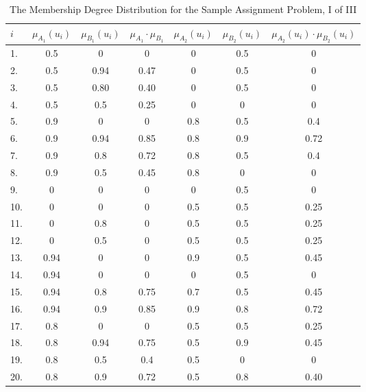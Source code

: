 \documentclass[a4paper,openany]{book}
\begin{document}
				\begin{table}[!th]
					\begin{tabular}{|l|c|c|c|c|c|c|}
					\hline
					\textbf{$i$} & \textbf{$\mu_{A_1}(u_i)$} & \textbf{$\mu_{B_1}(u_i)$} & \textbf{$\mu_{A_1}\cdot\mu_{B_1}$} & \textbf{$\mu_{A_2}(u_i)$} & \textbf{$\mu_{B_2}(u_i)$} & \textbf{$\mu_{A_2}(u_i)\cdot\mu_{B_2}(u_i)$}\\
					\hline
					1. & 0.5 & 0 & 0 & 0 & 0.5 & 0 \\
					\hline
					2. & 0.5 & 0.94 & 0.47 & 0 & 0.5 & 0 \\
					\hline
					3. & 0.5 & 0.80 & 0.40 & 0 & 0.5 & 0 \\
					\hline
					4. & 0.5 & 0.5 & 0.25 & 0 & 0 & 0 \\
					\hline
					5. & 0.9 & 0 & 0 & 0.8 & 0.5 & 0.4 \\
					\hline
					6. & 0.9 & 0.94 & 0.85 & 0.8 & 0.9 & 0.72 \\
					\hline
					7. & 0.9 & 0.8 & 0.72 & 0.8 & 0.5 & 0.4 \\
					\hline
					8. & 0.9 & 0.5 & 0.45 & 0.8 & 0 & 0 \\
					\hline
					9. & 0 & 0 & 0 & 0 & 0.5 & 0 \\
					\hline
					10. & 0 & 0 & 0 & 0.5 & 0.5 & 0.25 \\
					\hline
					11. & 0 & 0.8 & 0 & 0.5 & 0.5 & 0.25 \\
					\hline
					12. & 0 & 0.5 & 0 & 0.5 & 0.5 & 0.25 \\
					\hline
					13. & 0.94 & 0 & 0 & 0.9 & 0.5 & 0.45 \\
					\hline
					14. & 0.94 & 0 & 0 & 0 & 0.5 & 0 \\
					\hline
					15. & 0.94 & 0.8 & 0.75 & 0.7 & 0.5 & 0.45 \\
					\hline
					16. & 0.94 & 0.9 & 0.85 & 0.9 & 0.8 & 0.72 \\
					\hline
					17. & 0.8 & 0 & 0 & 0.5 & 0.5 & 0.25 \\
					\hline
					18. & 0.8 & 0.94 & 0.75 & 0.5 & 0.9 & 0.45 \\
					\hline
					19. & 0.8 & 0.5 & 0.4 & 0.5 & 0 & 0 \\
					\hline
					20. & 0.8 & 0.9 & 0.72 & 0.5 & 0.8 & 0.40 \\
					\hline
					\end{tabular}
					\caption{The Membership Degree Distribution for the Sample Assignment Problem, I of III}
					\label{ex:table2}
				\end{table}
\end{document}
